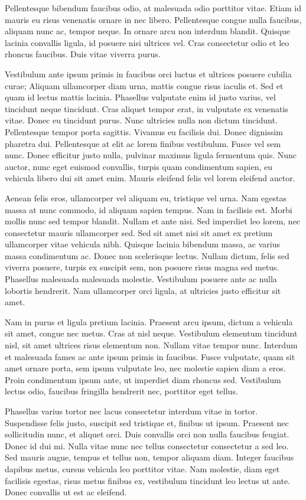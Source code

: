 Pellentesque bibendum faucibus odio, at malesuada odio porttitor vitae. 
Etiam id mauris eu risus venenatis ornare in nec libero. 
Pellentesque congue nulla faucibus, aliquam nunc ac, tempor neque. 
In ornare arcu non interdum blandit. 
Quisque lacinia convallis ligula, id posuere nisi ultrices vel. 
Cras consectetur odio et leo rhoncus faucibus. 
Duis vitae viverra purus.

Vestibulum ante ipsum primis in faucibus orci luctus et ultrices posuere cubilia curae; Aliquam ullamcorper diam urna, mattis congue risus iaculis et. 
Sed et quam id lectus mattis lacinia. 
Phasellus vulputate enim id justo varius, vel tincidunt neque tincidunt. 
Cras aliquet tempor erat, in vulputate ex venenatis vitae. 
Donec eu tincidunt purus. 
Nunc ultricies nulla non dictum tincidunt. 
Pellentesque tempor porta sagittis. 
Vivamus eu facilisis dui. 
Donec dignissim pharetra dui. 
Pellentesque at elit ac lorem finibus vestibulum. 
Fusce vel sem nunc. 
Donec efficitur justo nulla, pulvinar maximus ligula fermentum quis. 
Nunc auctor, nunc eget euismod convallis, turpis quam condimentum sapien, eu vehicula libero dui sit amet enim. 
Mauris eleifend felis vel lorem eleifend auctor.

Aenean felis eros, ullamcorper vel aliquam eu, tristique vel urna. 
Nam egestas massa at nunc commodo, id aliquam sapien tempus. 
Nam in facilisis est. 
Morbi mollis nunc sed tempor blandit. 
Nullam et ante nisi. 
Sed imperdiet leo lorem, nec consectetur mauris ullamcorper sed. 
Sed sit amet nisi sit amet ex pretium ullamcorper vitae vehicula nibh. 
Quisque lacinia bibendum massa, ac varius massa condimentum ac. 
Donec non scelerisque lectus. 
Nullam dictum, felis sed viverra posuere, turpis ex suscipit sem, non posuere risus magna sed metus. 
Phasellus malesuada malesuada molestie. 
Vestibulum posuere ante ac nulla lobortis hendrerit. 
Nam ullamcorper orci ligula, at ultricies justo efficitur sit amet.

Nam in purus et ligula pretium lacinia. 
Praesent arcu ipsum, dictum a vehicula sit amet, congue nec metus. 
Cras at nisl neque. 
Vestibulum elementum tincidunt nisl, sit amet ultrices risus elementum non. 
Nullam vitae tempor nunc. 
Interdum et malesuada fames ac ante ipsum primis in faucibus. 
Fusce vulputate, quam sit amet ornare porta, sem ipsum vulputate leo, nec molestie sapien diam a eros. 
Proin condimentum ipsum ante, ut imperdiet diam rhoncus sed. 
Vestibulum lectus odio, faucibus fringilla hendrerit nec, porttitor eget tellus.

Phasellus varius tortor nec lacus consectetur interdum vitae in tortor. 
Suspendisse felis justo, suscipit sed tristique et, finibus ut ipsum. 
Praesent nec sollicitudin nunc, et aliquet orci. 
Duis convallis orci non nulla faucibus feugiat. 
Donec id dui mi. 
Nulla vitae nunc nec tellus consectetur consectetur a sed leo. 
Sed mauris augue, tempus et tellus non, tempor aliquam diam. 
Integer faucibus dapibus metus, cursus vehicula leo porttitor vitae. 
Nam molestie, diam eget facilisis egestas, risus metus finibus ex, vestibulum tincidunt leo lectus ut ante. 
Donec convallis ut est ac eleifend.

